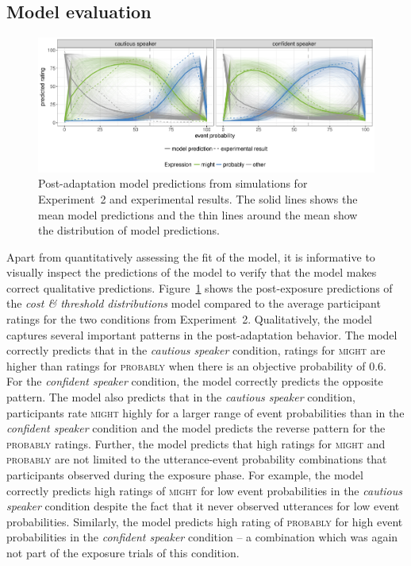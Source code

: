 \subsection{Model evaluation}
\label{subsec:adaptation-model-evaluation}

\begin{figure}
  \includegraphics[width=\textwidth]{plots/fig-10-adaptation-posterior-predictions-replication.pdf}
  \caption{Post-adaptation model predictions from simulations for Experiment~2 and experimental results. 
  The solid lines shows the mean model predictions and the thin lines around the mean show the distribution of model predictions. \label{fig:post-exposure-model}}
\end{figure}

Apart from quantitatively assessing the fit of the model, it is informative to visually inspect the predictions of the model to verify that the model makes correct qualitative predictions. 
Figure~\ref{fig:post-exposure-model} shows the post-exposure predictions of the \textit{cost \& threshold distributions} model compared to the average participant ratings for the two conditions from Experiment~2.
Qualitatively, 
the model captures several important patterns in the post-adaptation behavior. The model correctly predicts that in the \textit{cautious speaker} condition, ratings for \textsc{might} are 
higher than ratings for \textsc{probably} when there is an objective probability of 0.6. For the \textit{confident speaker} condition, the model correctly predicts the
opposite pattern. The model also predicts that in the \textit{cautious speaker} condition, participants rate \textsc{might} highly for a larger range of event probabilities than
in the \textit{confident speaker} condition and the model predicts the  reverse pattern for the \textsc{probably} ratings. Further, the model predicts that high ratings for \textsc{might} 
and \textsc{probably} are not limited to the utterance-event probability combinations that participants observed during the exposure phase. For example, the model correctly predicts
high ratings of \textsc{might} for low event probabilities in the \textit{cautious speaker} condition despite the fact that it never observed utterances for low event probabilities. Similarly,
the model predicts high rating of \textsc{probably} for high event probabilities in the \textit{confident speaker} condition -- a combination which was again not part of the exposure trials
of this condition.

